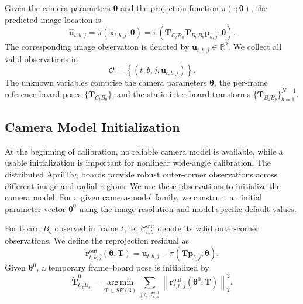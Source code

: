 \documentclass[letterpaper, 10 pt, conference]{ieeeconf}  %
\begin{document}
Given the camera parameters $\boldsymbol{\theta}$ and the projection
function $\pi(\cdot;\boldsymbol{\theta})$, the predicted image
location is
\begin{equation}
\hat{\mathbf{u}}_{t,b,j}
=
\pi\!\left(
\mathbf{x}_{t,b,j};
\boldsymbol{\theta}
\right)
=
\pi\!\left(
\mathbf{T}_{C_tB_0}
\mathbf{T}_{B_0B_b}
\mathbf{p}_{b,j};
\boldsymbol{\theta}
\right).
\end{equation}
The corresponding image observation is denoted by
$\mathbf{u}_{t,b,j}\in\mathbb{R}^2$. We collect all valid
observations in
\begin{equation}
\mathcal{O}
=
\left\{
(t,b,j,\mathbf{u}_{t,b,j})
\right\}.
\end{equation}
The unknown variables comprise the camera parameters
$\boldsymbol{\theta}$, the per-frame reference-board poses
$\{\mathbf{T}_{C_tB_0}\}$, and the static inter-board transforms
$\{\mathbf{T}_{B_0B_b}\}_{b=1}^{N-1}$.

\subsection{Camera Model Initialization}
\label{sec:camera_init}

At the beginning of calibration, no reliable camera model is available,
while a usable initialization is important for nonlinear wide-angle
calibration. The distributed AprilTag boards provide robust outer-corner
observations across different image and radial regions. We use these
observations to initialize the camera model. For a given camera-model
family, we construct an initial parameter vector
$\boldsymbol{\theta}^{0}$ using the image resolution and model-specific
default values.

For board $B_b$ observed in frame $t$, let
$\mathcal{C}^{\mathrm{out}}_{t,b}$ denote its valid outer-corner
observations. We define the reprojection residual as
\begin{equation}
\mathbf{r}^{\mathrm{out}}_{t,b,j}
(\boldsymbol{\theta},\mathbf{T})
=
\mathbf{u}_{t,b,j}
-
\pi\!\left(
\mathbf{T}\mathbf{p}_{b,j};
\boldsymbol{\theta}
\right).
\end{equation}
Given $\boldsymbol{\theta}^{0}$, a temporary frame--board pose is
initialized by
\begin{equation}
\widetilde{\mathbf{T}}^{0}_{C_tB_b}
=
\operatorname*{arg\,min}_{\mathbf{T}\in SE(3)}
\sum_{j\in\mathcal{C}^{\mathrm{out}}_{t,b}}
\left\|
\mathbf{r}^{\mathrm{out}}_{t,b,j}
(\boldsymbol{\theta}^{0},\mathbf{T})
\right\|_2^2 .
\end{equation}
\end{document}
